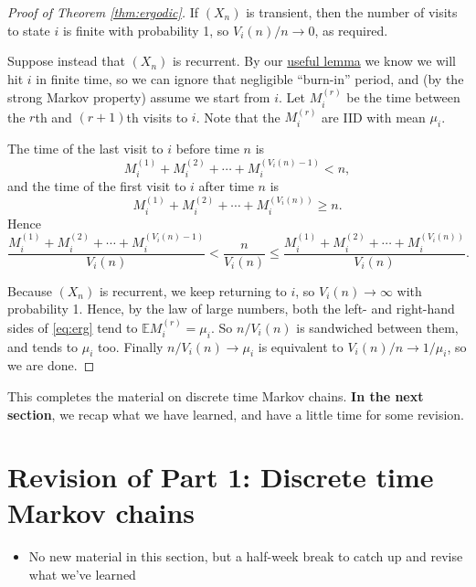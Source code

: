 \documentclass[
  a4paper,
]{article}
\providecommand{\tightlist}{%
  \setlength{\itemsep}{0pt}\setlength{\parskip}{0pt}}
\theoremstyle{definition}
\theoremstyle{definition}
\theoremstyle{definition}
\theoremstyle{remark}
\begin{document}
\begin{proof}[Proof of Theorem \ref{thm:ergodic}]

If \((X_n)\) is transient, then the number of visits to state \(i\) is finite with probability 1, so \(V_i(n)/n \to 0\), as required.

Suppose instead that \((X_n)\) is recurrent. By our \protect\hyperlink{S09-lemma}{useful lemma} we know we will hit \(i\) in finite time, so we can ignore that negligible ``burn-in'' period, and (by the strong Markov property) assume we start from \(i\). Let \(M_{i}^{(r)}\) be the time between the \(r\)th and \((r+1)\)th visits to \(i\). Note that the \(M_{i}^{(r)}\) are IID with mean \(\mu_i\).

The time of the last visit to \(i\) before time \(n\) is
\[ M_{i}^{(1)} + M_{i}^{(2)} + \cdots + M_{i}^{(V_i(n)-1)} < n ,\]
and the time of the first visit to \(i\) after time \(n\) is
\[ M_{i}^{(1)} + M_{i}^{(2)} + \cdots + M_{i}^{(V_i(n))} \geq n .\]
Hence
\begin{equation}
\frac{M_{i}^{(1)} + M_{i}^{(2)} + \cdots + M_{i}^{(V_i(n)-1)}}{V_i(n)} < \frac{n}{V_i(n)} \leq \frac{M_{i}^{(1)} + M_{i}^{(2)} + \cdots + M_{i}^{(V_i(n))}}{V_i(n)} . \label{eq:erg}
\end{equation}

Because \((X_n)\) is recurrent, we keep returning to \(i\), so \(V_i(n) \to \infty\) with probability 1. Hence, by the law of large numbers, both the left- and right-hand sides of \eqref{eq:erg} tend to \(\mathbb E M_{i}^{(r)} = \mu_i\). So \(n/V_i(n)\) is sandwiched between them, and tends to \(\mu_i\) too. Finally \(n/V_i(n) \to \mu_i\) is equivalent to \(V_i(n)/n \to 1/\mu_i\), so we are done.

\end{proof}

This completes the material on discrete time Markov chains. \textbf{In the next section}, we recap what we have learned, and have a little time for some revision.

\hypertarget{S11-revision-i}{%
\section{Revision of Part 1: Discrete time Markov chains}\label{S11-revision-i}}

\begin{itemize}
\tightlist
\item
  No new material in this section, but a half-week break to catch up and revise what we've learned
\end{itemize}
\end{document}
